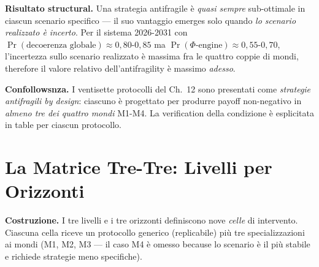 \Proved{} \textbf{Risultato structural.} Una strategia antifragile è
\emph{quasi sempre} sub-ottimale in ciascun scenario specifico --- il
suo vantaggio emerges solo quando \emph{lo scenario realizzato è
incerto}. Per il sistema 2026-2031 con
\(\Pr(\text{decoerenza globale}) \approx 0{,}80\)-\(0{,}85\) ma
\(\Pr(\Phi\text{-engine}) \approx 0{,}55\)-\(0{,}70\), l'incertezza
sullo scenario realizzato è massima fra le quattro coppie di mondi,
therefore il valore relativo dell'antifragility è massimo \emph{adesso}.

\Hypoth{} \textbf{Confollowsnza.} I ventisette protocolli del Ch.~12 sono
presentati come \emph{strategie antifragili by design}: ciascuno è
progettato per produrre payoff non-negativo in \emph{almeno tre dei
quattro mondi} M1-M4. La verification della condizione è esplicitata in
table per ciascun protocollo.



\section{La Matrice Tre-Tre: Livelli per
Orizzonti}\label{la-matrice-tre-tre-livelli-per-orizzonti}

\Hypoth{} \textbf{Costruzione.} I tre livelli e i tre orizzonti
definiscono nove \emph{celle} di intervento. Ciascuna cella riceve un
protocollo generico (replicabile) più tre specializzazioni ai mondi (M1,
M2, M3 --- il caso M4 è omesso because lo scenario è il più stabile e
richiede strategie meno specifiche).

